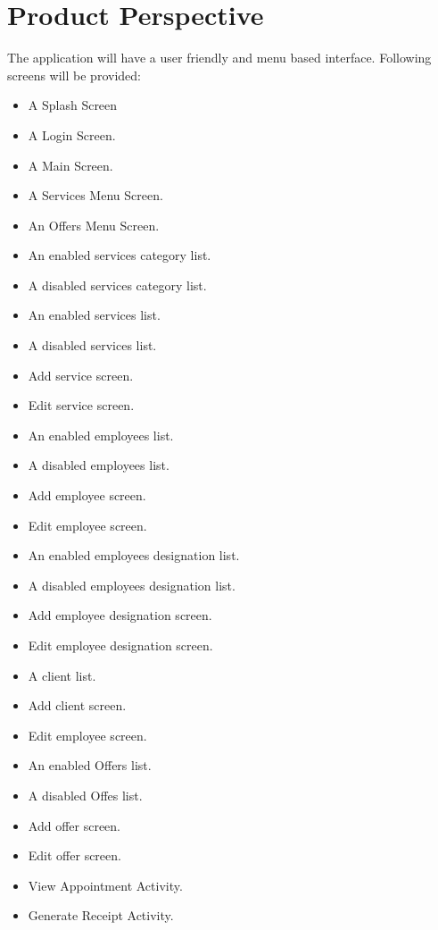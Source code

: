 \section{Product Perspective}
The application will have a user friendly and menu based interface. Following screens will be provided:
\begin{itemize}
	\item A Splash Screen
	\item A Login Screen.
	\item A Main Screen.
	\item A Services Menu Screen.
	\item An Offers Menu Screen.
	
	\item An enabled services category list.
	\item A disabled services category list.
	\item An enabled services list.
	\item A disabled services list.
	\item Add service screen.
	\item Edit service screen.
	
	\item An enabled employees list.
	\item A disabled employees list.
	\item Add employee screen.
	\item Edit employee screen.
	
	\item An enabled employees designation list.
	\item A disabled employees designation list.
	\item Add employee designation screen.
	\item Edit employee designation screen.
	
	\item A client list.
	\item Add client screen.
	\item Edit employee screen.
	
	\item An enabled Offers list.
	\item A disabled Offes list.
	\item Add offer screen.
	\item Edit offer screen.
	
	\item View Appointment Activity.
	\item Generate Receipt Activity.

	
	
\end{itemize}
